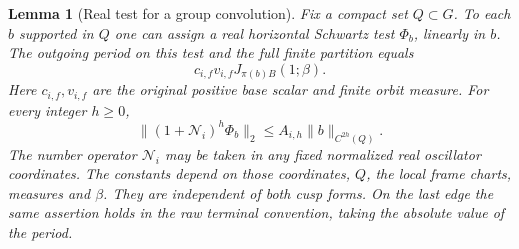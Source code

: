 \documentclass[a4paper,11pt]{article}
\newtheorem{lemma}[proposition]{Lemma}
\theoremstyle{definition}
\theoremstyle{remark}
\numberwithin{equation}{section}
\begin{document}
\begin{lemma}[Real test for a group convolution]\leavevmode
\label{lem:transfer270}
Fix a compact set \(Q\subset G\). To each \(b\) supported in
\(Q\) one can assign a real horizontal Schwartz test \(\Phi_b\),
linearly in \(b\). The outgoing period on this test and the full
finite partition equals
\[
                c_{i,f}v_{i,f} J_{\pi(b)B}(1;\beta).
\]
Here \(c_{i,f},v_{i,f}\) are the original positive base scalar
and finite orbit measure. For every integer \(h\ge0\),
\[
       \|(1+\mathcal N_i)^h\Phi_b\|_2
                     \le A_{i,h}\|b\|_{C^{2h}(Q)} .
\]
The number operator \(\mathcal N_i\) may be taken in any
fixed normalized real oscillator coordinates. The constants
depend on those coordinates, \(Q\), the local frame charts,
measures and \(\beta\). They are independent of both cusp
forms. On the last edge the same assertion holds in the raw
terminal convention, taking the absolute value of the period.
\end{lemma}
\end{document}
